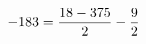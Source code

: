 \documentclass[preview]{standalone}
\begin{document}
\begin{align*}
\special{dvisvgm:raw <g id='unique000'>}-183 = \frac{18 - 375}{2} - \frac{9}{2}\special{dvisvgm:raw </g>}
\end{align*}
\end{document}
